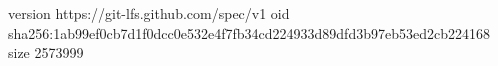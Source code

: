 version https://git-lfs.github.com/spec/v1
oid sha256:1ab99ef0cb7d1f0dcc0e532e4f7fb34cd224933d89dfd3b97eb53ed2cb224168
size 2573999
